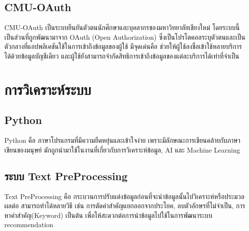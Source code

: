 \subsection{CMU-OAuth}
CMU-OAuth เป็นระบบยืนยันตัวตนนักศึกษาและบุคลากรของมหาวิทยาลัยเชียงใหม่ โดยระบบนี้เป็นส่วนที่ถูกพัฒนามาจาก OAuth (Open Authorization) ซึ่งเป็นโปรโตคอลระบุตัวตนและเป็นตัวกลางที่แอปพลิเคชันใช้ในการเข้าถึงข้อมูลของผู้ใช้ มีจุดเด่นคือ ช่วยให้ผู้ใช้ลงชื่อเข้าใช้หลายบริการ
ได้ด้วยข้อมูลบัญชีเดียว และผู้ใช้ยังสามารถจำกัดสิทธิการเข้าถึงข้อมูลของแต่ละบริการได้เท่าที่จำเป็น
\cite{oauth}
\section{การวิเคราะห์ระบบ}
\subsection{Python}
Python คือ ภาษาโปรแกรมที่มีความยืดหยุ่นและเข้าใจง่าย เพราะมีลักษณะการเขียนคล้ายกับภาษาเขียนของมนุษย์ มักถูกนำมาใช้ในงานที่เกี่ยวกับการวิเคราะห์ข้อมูล, AI และ Machine Learning 
\cite{python}
\subsection{ระบบ Text PreProcessing}
Text PreProcessing คือ กระบวนการปรับแต่งข้อมูลก่อนที่จะนำข้อมูลนั้นไปวิเคราะห์หรือประมวลผลต่อ สามารถทำได้หลายวิธี เช่น การตัดคำสำคัญแยกออกจากประโยค, ลบตัวอักษรที่ไม่จำเป็น, การหาคำสำคัญ(Keyword) เป็นต้น เพื่อให้สะดวกต่อการนำข้อมูลไปใช้ในการพัฒนาระบบ recommendation
\cite{prepros}

